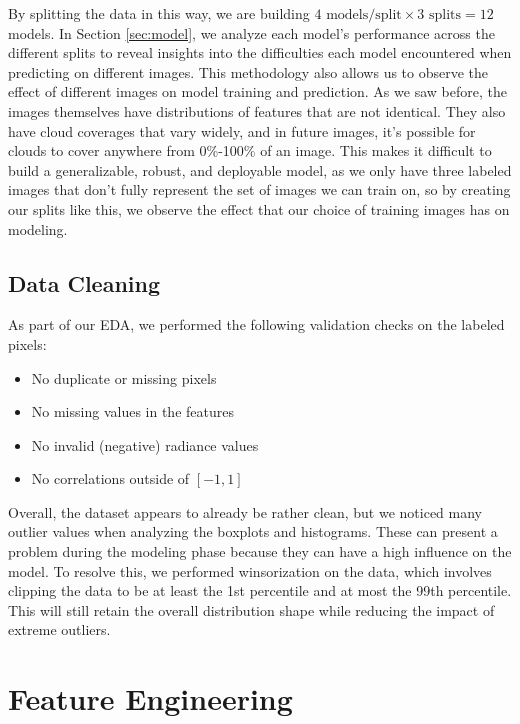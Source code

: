 \documentclass[11pt,letterpaper]{article}
\begin{document}
By splitting the data in this way, we are building $4 \text{ models/split}\times 3 \text{ splits} = 12$ models. In Section \ref{sec:model}, we analyze each model's performance across the different splits to reveal insights into the difficulties each model encountered when predicting on different images. This methodology also allows us to observe the effect of different images on model training and prediction. As we saw before, the images themselves have distributions of features that are not identical. They also have cloud coverages that vary widely, and in future images, it's possible for clouds to cover anywhere from 0\%-100\% of an image. This makes it difficult to build a generalizable, robust, and deployable model, as we only have three labeled images that don't fully represent the set of images we can train on, so by creating our splits like this, we observe the effect that our choice of training images has on modeling.

\subsection{Data Cleaning}

As part of our EDA, we performed the following validation checks on the labeled pixels:

\begin{itemize}
    \item No duplicate or missing pixels
    \item No missing values in the features
    \item No invalid (negative) radiance values
    \item No correlations outside of $[-1, 1]$
\end{itemize}

Overall, the dataset appears to already be rather clean, but we noticed many outlier values when analyzing the boxplots and histograms. These can present a problem during the modeling phase because they can have a high influence on the model. To resolve this, we performed winsorization on the data, which involves clipping the data to be at least the 1st percentile and at most the 99th percentile. This will still retain the overall distribution shape while reducing the impact of extreme outliers.

\section{Feature Engineering}
\label{sec:feat_eng}
\end{document}
